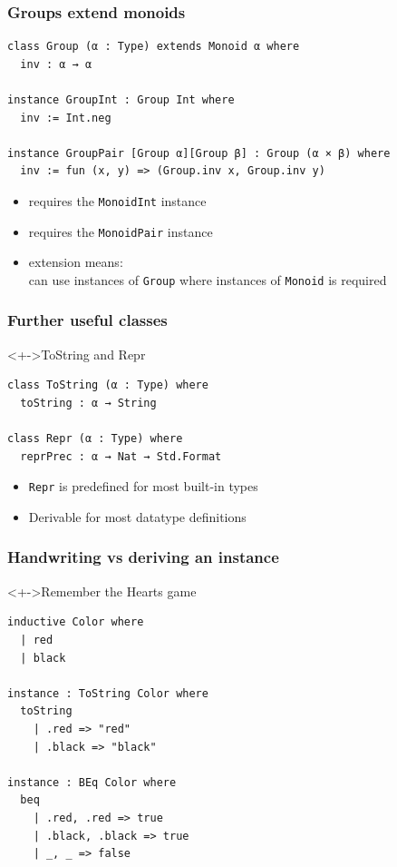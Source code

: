 \documentclass{beamer}
\begin{document}
\begin{frame}
  \frametitle{Groups extend monoids}
\begin{lstlisting}
class Group (α : Type) extends Monoid α where
  inv : α → α

instance GroupInt : Group Int where
  inv := Int.neg

instance GroupPair [Group α][Group β] : Group (α × β) where
  inv := fun (x, y) => (Group.inv x, Group.inv y)
\end{lstlisting}
  \begin{itemize}
  \item requires the \lstinline{MonoidInt} instance
  \item requires the \lstinline{MonoidPair} instance
  \item extension means:\\ can use instances of \lstinline{Group} where instances
    of \lstinline{Monoid} is required 
  \end{itemize}
\end{frame}
\begin{frame}[fragile]
  \frametitle{Further useful classes}
  \begin{block}<+->{ToString and Repr}
\begin{lstlisting}
class ToString (α : Type) where
  toString : α → String

class Repr (α : Type) where
  reprPrec : α → Nat → Std.Format
\end{lstlisting}
    \begin{itemize}
    \item \lstinline{Repr} is predefined for most built-in types
    \item Derivable for most datatype definitions
    \end{itemize}
  \end{block}
\end{frame}
\begin{frame}[fragile]
  \frametitle{Handwriting vs deriving an instance}
  \begin{block}<+->{Remember the Hearts game}
\begin{lstlisting}
inductive Color where
  | red
  | black

instance : ToString Color where
  toString
    | .red => "red"
    | .black => "black"

instance : BEq Color where
  beq
    | .red, .red => true
    | .black, .black => true
    | _, _ => false
\end{lstlisting}
  \end{block}
\end{frame}
\end{document}
